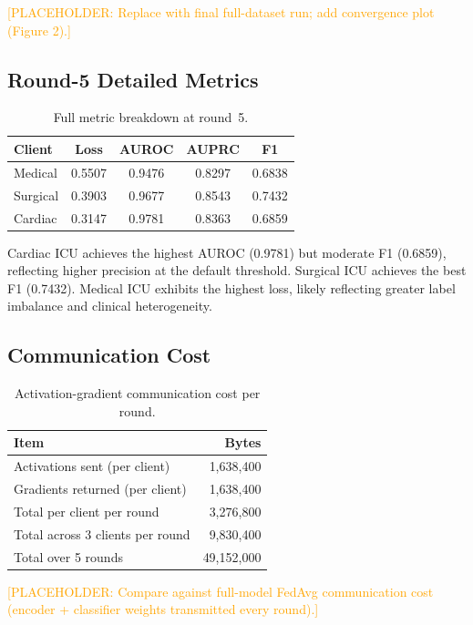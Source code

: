 \documentclass[10pt,twocolumn]{article}
\newcommand{\placeholder}[1]{\textcolor{orange}{[PLACEHOLDER: #1]}}
\begin{document}
\placeholder{Replace with final full-dataset run; add convergence
plot (Figure 2).}

\subsection{Round-5 Detailed Metrics}

\begin{table}[h]
\centering
\caption{Full metric breakdown at round~5.}
\label{tab:round5}
\begin{tabular}{lcccc}
\toprule
Client   & Loss   & AUROC  & AUPRC  & F1     \\
\midrule
Medical  & 0.5507 & 0.9476 & 0.8297 & 0.6838 \\
Surgical & 0.3903 & 0.9677 & 0.8543 & 0.7432 \\
Cardiac  & 0.3147 & 0.9781 & 0.8363 & 0.6859 \\
\bottomrule
\end{tabular}
\end{table}

Cardiac ICU achieves the highest AUROC (0.9781) but moderate F1
(0.6859), reflecting higher precision at the default threshold.
Surgical ICU achieves the best F1 (0.7432).  Medical ICU exhibits the
highest loss, likely reflecting greater label imbalance and clinical
heterogeneity.

\subsection{Communication Cost}

\begin{table}[h]
\centering
\caption{Activation-gradient communication cost per round.}
\label{tab:comm}
\begin{tabular}{lr}
\toprule
Item & Bytes \\
\midrule
Activations sent (per client)           & 1,638,400 \\
Gradients returned (per client)         & 1,638,400 \\
Total per client per round              & 3,276,800 \\
Total across 3 clients per round        & 9,830,400 \\
Total over 5 rounds                     & 49,152,000 \\
\bottomrule
\end{tabular}
\end{table}

\placeholder{Compare against full-model FedAvg communication cost
(encoder + classifier weights transmitted every round).}
\end{document}
